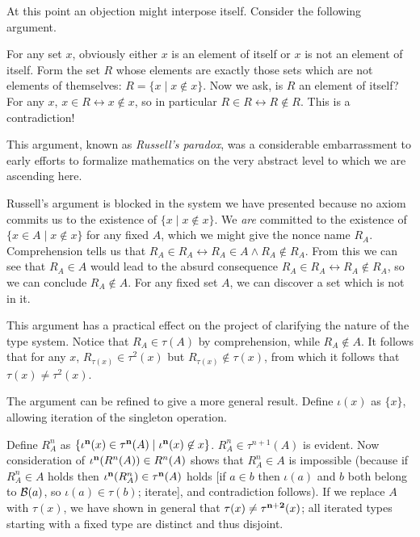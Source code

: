 \documentclass[12pt]{book}
\begin{document}
At this point an objection might interpose itself.  Consider the
following argument.

For any set $x$, obviously either $x$ is an element of itself or $x$
is not an element of itself.  Form the set $R$ whose elements are
exactly those sets which are not elements of themselves: $R = \{x \mid
x \not\in x\}$.  Now we ask, is $R$ an element of itself?  For any $x$,
$x \in R \leftrightarrow x \not\in x$, so in particular $R \in R \leftrightarrow R
\not\in R$.  This is a contradiction!

This argument, known as {\em Russell's paradox\/}, was a considerable
embarrassment to early efforts to formalize mathematics on the very
abstract level to which we are ascending here.  

Russell's argument is blocked in the system we have presented because no axiom commits us to the existence
of $\{x \mid x \not\in x\}$.  We {\em are\/} committed to the existence of $\{x \in A\mid x \not\in x\}$ for any fixed $A$, which we might give the nonce name $R_A$.
Comprehension tells us that $R_A \in R_A \leftrightarrow R_A \in A \wedge R_A \not\in R_A$.  From this we can see that $R_A \in A$ would lead to the absurd consequence
$R_A \in R_A \leftrightarrow R_A \not\in R_A$, so we can conclude $R_A \not\in A$.  For any fixed set $A$, we can discover a set which is not in it.

This argument has a practical effect on the project of clarifying the nature of the  type system.  Notice that $R_A \in \tau(A)$ by comprehension, while $R_A \not\in A$.  It follows that for any $x$, $R_{\tau(x)} \in \tau^2(x)$ but
$R_{\tau(x)} \not\in \tau(x)$, from which it follows that $\tau(x) \neq \tau^2(x)$.

The argument can be refined to give a more general result.  Define $\iota(x)$ as $\{x\}$, allowing iteration of the singleton operation.

Define $R^n_A$ as $\{\iota^{\bf n}(x) \in \tau^{\bf n}(A)\mid \iota^{\bf n}(x) \not\in x\}$.  $R^n_A \in \tau^{n+1}(A)$ is evident.  Now consideration of $\iota^{\bf n}(R^n(A)) \in R^n(A)$ shows
that $R^n_A \in A$ is impossible (because if $R^n_A \in A$ holds then $\iota^{\bf n}(R^n_A) \in \tau^{\bf n}(A)$ holds [if $a \in b$ then $\iota(a)$ and $b$ both belong to ${\cal B}(a)$, so $\iota(a) \in \tau(b)$; iterate], and contradiction follows).  If we replace $A$ with
$\tau(x)$, we have shown in general that $\tau(x) \neq \tau^{\bf n+2}(x)$;  all iterated types starting with a fixed type are distinct and thus disjoint.
\end{document}
